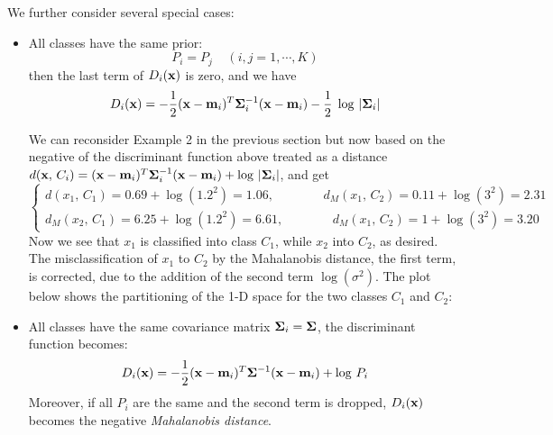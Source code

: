 \documentclass{article}
\begin{document}
We further consider several special cases:
\begin{itemize}
\item All classes have the same prior:
  \begin{equation}
    P_i=P_j\;\;\;\;(i,j=1,\cdots,K)
  \end{equation}
  then the last term of $D_i({\bf x})$ is zero, and we have
  \begin{equation}
    D_i({\bf x})=-\frac{1}{2}({\bf x}-{\bf m}_i)^T{\bf \Sigma}_i^{-1}({\bf x}-{\bf m}_i)
    -\frac{1}{2}\;\log\,|{\bf \Sigma}_i |
  \end{equation}

  We can reconsider Example 2 in the previous section but now based on 
  the negative of the discriminant function above treated as a distance
  $d({\bf x},\,C_i)=({\bf x}-{\bf m}_i)^T{\bf \Sigma}_i^{-1}({\bf x}-{\bf m}_i)
  +\log\,|{\bf \Sigma}_i |$, and get
  \begin{equation}
    \left\{ \begin{array}{l}
      d(x_1,\,C_1)=0.69+\log(1.2^2)=1.06,   \;\;\;\;\;\;\;\;\;\;\;\;\;\;
      d_M(x_1,\,C_2)=0.11+\log(3^2)=2.31\\
      d_M(x_2,\,C_1)=6.25+\log(1.2^2)=6.61,  \;\;\;\;\;\;\;\;\;\;\;\;\;\;
      d_M(x_1,\,C_2)=1+\log(3^2)=3.20
    \end{array}\right.
  \end{equation}
  Now we see that $x_1$ is classified into class $C_1$, while $x_2$ into $C_2$,
  as desired. The misclassification of $x_1$ to $C_2$ by the Mahalanobis 
  distance, the first term, is corrected, due to the addition of the second 
  term $\log(\sigma^2)$. The plot below shows the partitioning of the 1-D
  space for the two classes $C_1$ and $C_2$:



\item All classes have the same covariance matrix ${\bf\Sigma}_i={\bf\Sigma}$,
  the discriminant function becomes:
  \begin{equation} 
    D_i({\bf x})=-\frac{1}{2}({\bf x}-{\bf m}_i)^T{\bf \Sigma}^{-1}({\bf x}-{\bf m}_i)
    +\log\,P_i 
  \end{equation}
  Moreover, if all $P_i$ are the same and the second term is dropped,
  $D_i({\bf x})$ becomes the negative {\em Mahalanobis distance}.


\end{itemize}
\end{document}
